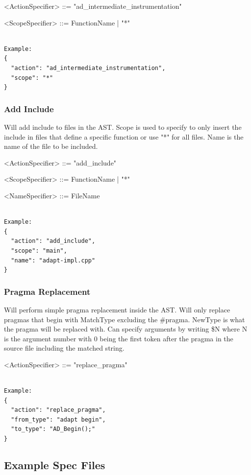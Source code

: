 \documentclass[natbib]{article}
\begin{document}
\begin{grammar}
<ActionSpecifier> ::= "ad_intermediate_instrumentation"

<ScopeSpecifier>     ::=  FunctionName | "*"
\end{grammar}
\begin{verbatim}  

Example:
{
  "action": "ad_intermediate_instrumentation",
  "scope": "*"
}
\end{verbatim}

\subsubsection{Add Include}
Will add include to files in the AST. Scope is used to specify  to
only insert the include in files that define a specific function or use "*" for all files. 
Name is the name of the file to be included.

\begin{grammar}
<ActionSpecifier> ::= "add_include"

<ScopeSpecifier>     ::=  FunctionName | "*"

<NameSpecifier>     ::= FileName
\end{grammar}
\begin{verbatim}

Example:
{
  "action": "add_include",
  "scope": "main",
  "name": "adapt-impl.cpp"
}
\end{verbatim}

\subsubsection{Pragma Replacement} 
Will perform simple pragma replacement inside the AST. Will only 
replace pragmas that begin with MatchType excluding the \#pragma. NewType is what the 
pragma will be replaced with. Can specify arguments by writing \$N where N is the argument 
number with 0 being the first token after the pragma in the source file including the matched string.

\begin{grammar}
<ActionSpecifier>  ::= "replace_pragma"
\end{grammar}
\begin{verbatim}

Example:
{
  "action": "replace_pragma",
  "from_type": "adapt begin",
  "to_type": "AD_Begin();"
}
\end{verbatim}

\subsection{Example Spec Files} \label{sec:expampleSpec}
\end{document}
